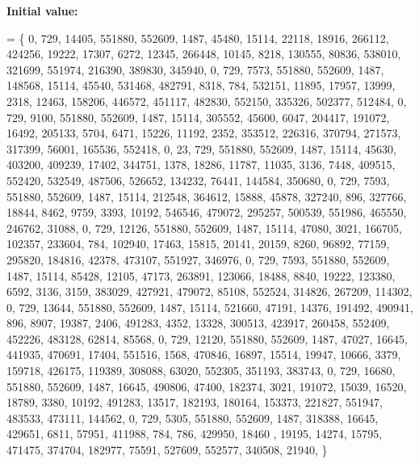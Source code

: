 {\bfseries Initial value\+:}
\begin{DoxyCode}
= \{ 
    0, 729, 14405, 551880, 552609, 1487, 45480, 15114, 22118, 18916, 266112, 424256, 19222, 17307, 6272, 
      12345, 266448, 10145, 8218, 130555, 80836, 538010, 321699, 551974, 216390, 389830, 345940, 
    0, 729, 7573, 551880, 552609, 1487, 148568, 15114, 45540, 531468, 482791, 8318, 784, 532151, 11895, 
      17957, 13999, 2318, 12463, 158206, 446572, 451117, 482830, 552150, 335326, 502377, 512484, 
    0, 729, 9100, 551880, 552609, 1487, 15114, 305552, 45600, 6047, 204417, 191072, 16492, 205133, 5704, 
      6471, 15226, 11192, 2352, 353512, 226316, 370794, 271573, 317399, 56001, 165536, 552418, 
    0, 23, 729, 551880, 552609, 1487, 15114, 45630, 403200, 409239, 17402, 344751, 1378, 18286, 11787, 
      11035, 3136, 7448, 409515, 552420, 532549, 487506, 526652, 134232, 76441, 144584, 350680, 
    0, 729, 7593, 551880, 552609, 1487, 15114, 212548, 364612, 15888, 45878, 327240, 896, 327766, 18844, 
      8462, 9759, 3393, 10192, 546546, 479072, 295257, 500539, 551986, 465550, 246762, 31088, 
    0, 729, 12126, 551880, 552609, 1487, 15114, 47080, 3021, 166705, 102357, 233604, 784, 102940, 17463, 
      15815, 20141, 20159, 8260, 96892, 77159, 295820, 184816, 42378, 473107, 551927, 346976, 
    0, 729, 7593, 551880, 552609, 1487, 15114, 85428, 12105, 47173, 263891, 123066, 18488, 8840, 19222, 
      123380, 6592, 3136, 3159, 383029, 427921, 479072, 85108, 552524, 314826, 267209, 114302, 
    0, 729, 13644, 551880, 552609, 1487, 15114, 521660, 47191, 14376, 191492, 490941, 896, 8907, 19387, 
      2406, 491283, 4352, 13328, 300513, 423917, 260458, 552409, 452226, 483128, 62814, 85568, 
    0, 729, 12120, 551880, 552609, 1487, 47027, 16645, 441935, 470691, 17404, 551516, 1568, 470846, 16897, 
      15514, 19947, 10666, 3379, 159718, 426175, 119389, 308088, 63020, 552305, 351193, 383743, 
    0, 729, 16680, 551880, 552609, 1487, 16645, 490806, 47400, 182374, 3021, 191072, 15039, 16520, 18789, 
      3380, 10192, 491283, 13517, 182193, 180164, 153373, 221827, 551947, 483533, 473111, 144562, 
    0, 729, 5305, 551880, 552609, 1487, 318388, 16645, 429651, 6811, 57951, 411988, 784, 786, 429950, 18460
      , 19195, 14274, 15795, 471475, 374704, 182977, 75591, 527609, 552577, 340508, 21940, 
\}
\end{DoxyCode}
\mbox{\label{surface__27_8_c_a0e5bb03ae172c52c2a86ca0b8be9281a}} 
